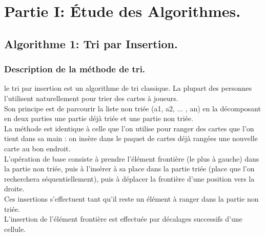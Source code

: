 \documentclass[12pt]{article}
\begin{document}
\newpage

\section{Partie I: Étude des Algorithmes.}

\subsection{Algorithme 1: Tri par Insertion.}
\subsubsection{Description de la méthode de tri.}
le tri par insertion est un algorithme de tri classique. 
La plupart des personnes l'utilisent naturellement pour trier des cartes à joueurs.\\

Son principe est de parcourir la liste non triée (a1, a2, ... , an) en la décomposant en deux parties 
une partie déjà triée et une partie non triée.\\

La méthode est identique à celle que l'on utilise pour ranger des cartes que l'on tient dans sa main :
 on insère dans le paquet de cartes déjà rangées une nouvelle carte au bon endroit.\\
 
 L'opération de base consiste à prendre l'élément frontière (le plus à gauche) dans la partie non triée,
 puis à l'insérer à sa place dans la partie triée (place que l'on recherchera séquentiellement),
 puis à déplacer la frontière d'une position vers la droite.\\
 
 Ces insertions s'effectuent tant qu'il reste un élément à ranger dans la partie non triée.\\
  
 L'insertion de l'élément frontière est effectuée par décalages successifs d'une cellule.\\
 
\end{document}
